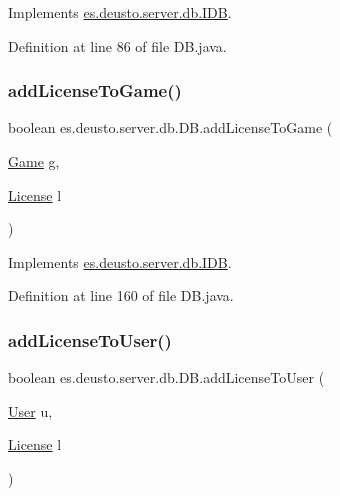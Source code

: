 Implements \hyperlink{interfacees_1_1deusto_1_1server_1_1db_1_1_i_d_b_a645335b2cbfa27c0199783ff2f33559e}{es.\+deusto.\+server.\+db.\+I\+DB}.



Definition at line 86 of file D\+B.\+java.

\mbox{\label{classes_1_1deusto_1_1server_1_1db_1_1_d_b_a5f4f68a9d2b7d6e8fbcc6e28136b92c8}} 
\subsubsection{\texorpdfstring{add\+License\+To\+Game()}{addLicenseToGame()}}
{\footnotesize\ttfamily boolean es.\+deusto.\+server.\+db.\+D\+B.\+add\+License\+To\+Game (\begin{DoxyParamCaption}\item[{\hyperlink{classes_1_1deusto_1_1server_1_1db_1_1data_1_1_game}{Game}}]{g,  }\item[{\hyperlink{classes_1_1deusto_1_1server_1_1db_1_1data_1_1_license}{License}}]{l }\end{DoxyParamCaption})}



Implements \hyperlink{interfacees_1_1deusto_1_1server_1_1db_1_1_i_d_b_a6ca49e0ed9bd7826c4ee65cb5f0f583b}{es.\+deusto.\+server.\+db.\+I\+DB}.



Definition at line 160 of file D\+B.\+java.

\mbox{\label{classes_1_1deusto_1_1server_1_1db_1_1_d_b_a996d40d6b184ea0dfa3dcab05bc04757}} 
\subsubsection{\texorpdfstring{add\+License\+To\+User()}{addLicenseToUser()}}
{\footnotesize\ttfamily boolean es.\+deusto.\+server.\+db.\+D\+B.\+add\+License\+To\+User (\begin{DoxyParamCaption}\item[{\hyperlink{classes_1_1deusto_1_1server_1_1db_1_1data_1_1_user}{User}}]{u,  }\item[{\hyperlink{classes_1_1deusto_1_1server_1_1db_1_1data_1_1_license}{License}}]{l }\end{DoxyParamCaption})}



